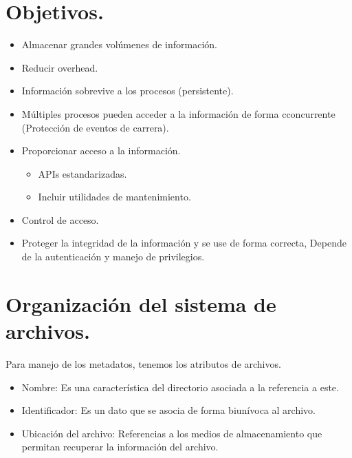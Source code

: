 \part{Objetivos.}
\begin{itemize}
	\item Almacenar grandes vol\'{u}menes de informaci\'{o}n.
	\item Reducir overhead.
	\item Informaci\'{o}n sobrevive a los procesos (persistente).
	\item M\'{u}ltiples procesos pueden acceder a la informaci\'{o}n de forma cconcurrente (Protecci\'{o}n de eventos de carrera).
	\item Proporcionar acceso a la informaci\'{o}n.
		\begin{itemize}
			\item APIs estandarizadas.
			\item Incluir utilidades de mantenimiento.
		\end{itemize}
	\item Control de acceso.
	\item Proteger la integridad de la informaci\'{o}n y se use de forma correcta, Depende de la autenticaci\'{o}n y manejo de privilegios.
\end{itemize}

\part{Organizaci\'{o}n del sistema de archivos.}
Para manejo de los metadatos, tenemos los atributos de archivos.
\begin{itemize}
	\item Nombre: Es una caracter\'{i}stica del directorio asociada a la referencia a este.
	\item Identificador: Es un dato que se asocia de forma biun\'{i}voca al archivo.
	\item Ubicaci\'{o}n del archivo: Referencias a los medios de almacenamiento que permitan recuperar la informaci\'{o}n del archivo.
\end{itemize}
